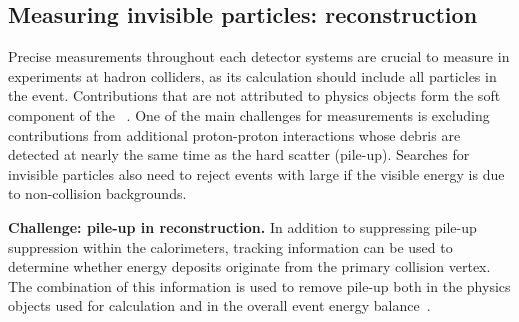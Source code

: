 \begin{textbox}[!h]
\section{Measuring invisible particles: \MET reconstruction}

Precise measurements throughout each detector systems are crucial to measure \MET in experiments at hadron colliders, 
as its calculation should include all particles in the event.
Contributions that are not attributed to physics objects form the soft component of the \MET~\cite{Aad:2016nrq,CMS-PAS-JME-16-004}. 
One of the main challenges for \MET measurements is excluding contributions from additional proton-proton interactions whose debris are detected at nearly the same time as the hard scatter (pile-up).
Searches for invisible particles also need to reject events with large \MET if the visible energy is due to non-collision backgrounds. 

\textbf{Challenge: pile-up in \MET reconstruction.} 
In addition to suppressing pile-up suppression within the calorimeters, tracking information can be used to determine whether energy deposits originate from the primary collision vertex. 
The combination of this information is used to remove pile-up both in the physics objects used for \MET calculation and in the overall event energy balance~\cite{CMS-PAS-JME-16-004,ATLAS-CONF-2014-019}. 



\end{textbox}
